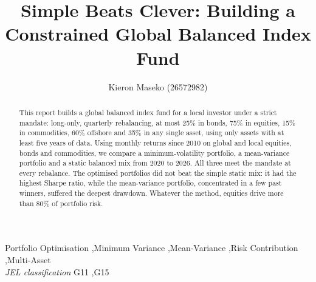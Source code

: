 \documentclass[11pt,preprint]{elsarticle}
\numberwithin{equation}{section}
\numberwithin{figure}{section}
\numberwithin{table}{section}
\begin{document}
\begin{frontmatter}  %

\title{Simple Beats Clever: Building a Constrained Global Balanced Index
Fund}





\author[Add1]{Kieron Maseko (26572982)}





\address[Add1]{Stellenbosch University, Stellenbosch, South Africa}


\begin{abstract}
\small{
This report builds a global balanced index fund for a local investor
under a strict mandate: long-only, quarterly rebalancing, at most 25\%
in bonds, 75\% in equities, 15\% in commodities, 60\% offshore and 35\%
in any single asset, using only assets with at least five years of data.
Using monthly returns since 2010 on global and local equities, bonds and
commodities, we compare a minimum-volatility portfolio, a mean-variance
portfolio and a static balanced mix from 2020 to 2026. All three meet
the mandate at every rebalance. The optimised portfolios did not beat
the simple static mix: it had the highest Sharpe ratio, while the
mean-variance portfolio, concentrated in a few past winners, suffered
the deepest drawdown. Whatever the method, equities drive more than 80\%
of portfolio risk.
}
\end{abstract}

\vspace{1cm}


\begin{keyword}
\footnotesize{
Portfolio Optimisation \sep Minimum Variance \sep Mean-Variance
\sep Risk Contribution \sep Multi-Asset \\
\vspace{0.3cm}
}
\footnotesize{
\textit{JEL classification} G11 \sep G15
}
\end{keyword}



\vspace{0.5cm}

\end{frontmatter}

\setcounter{footnote}{0}



\pagestyle{fancy}
\chead{}
\rhead{}
\lfoot{}
\lhead{}
\cfoot{}
\end{document}
